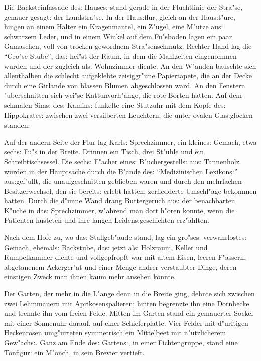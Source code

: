 \documentclass[oneside,12pt]{book}
\newcommand{\s}{s:}%
\begin{document}
\newpage\begin{center}
{\large \so{F"unfte{\s} Kapitel}}\bigskip\bigskip
\end{center}

Die Backsteinfassade de{\s} Hause{\s} stand gerade in der
Fluchtlinie der Stra"se, genauer gesagt: der Landstra"se. In der
Hau{\s}flur, gleich an der Hau{\s}t"ure, hingen an einem Halter
ein Kragenmantel, ein Z"ugel, eine M"utze au{\s} schwarzem Leder,
und in einem Winkel auf dem Fu"sboden lagen ein paar Gamaschen,
voll von trocken gewordnem Stra"senschmutz. Rechter Hand lag die
"`Gro"se Stube"', da{\s} hei"st der Raum, in dem die Mahlzeiten
eingenommen wurden und der zugleich al{\s} Wohnzimmer diente. An
den W"anden bauschte sich allenthalben die schlecht aufgeklebte
zeisiggr"une Papiertapete, die an der Decke durch eine Girlande
von blassen Blumen abgeschlossen ward. An den Fenstern
"uberschnitten sich wei"se Kattunvorh"ange, die rote Borten
hatten. Auf dem schmalen Sim{\s} de{\s} Kamin{\s} funkelte eine
Stutzuhr mit dem Kopfe de{\s} Hippokrate{\s} zwischen zwei
versilberten Leuchtern, die unter ovalen Gla{\s}glocken standen.

Auf der andern Seite der Flur lag Karl{\s} Sprechzimmer, ein
kleine{\s} Gemach, etwa sech{\s} Fu"s in der Breite. Drinnen ein
Tisch, drei St"uhle und ein Schreibtischsessel. Die sech{\s}
F"acher eine{\s} B"uchergestell{\s} au{\s} Tannenholz wurden in
der Hauptsache durch die B"ande de{\s} "`Medizinischen
Lexikon{\s}"' au{\s}gef"ullt, die unaufgeschnitten geblieben waren
und durch den mehrfachen Besitzerwechsel, den sie bereit{\s}
erlebt hatten, zerfledderte Umschl"age bekommen hatten. Durch die
d"unne Wand drang Buttergeruch au{\s} der benachbarten K"uche in
da{\s} Sprechzimmer, w"ahrend man dort h"oren konnte, wenn die
Patienten husteten und ihre langen Leiden{\s}geschichten
erz"ahlten.

Nach dem Hofe zu, wo da{\s} Stallgeb"aude stand, lag ein
gro"se{\s} verwahrloste{\s} Gemach, ehemal{\s} Backstube, da{\s}
jetzt al{\s} Holzraum, Keller und Rumpelkammer diente und
vollgepfropft war mit altem Eisen, leeren F"assern, abgetanenem
Ackerger"at und einer Menge andrer verstaubter Dinge, deren
einstigen Zweck man ihnen kaum mehr ansehen konnte.

Der Garten, der mehr in die L"ange denn in die Breite ging, dehnte
sich zwischen zwei Lehmmauern mit Aprikosenspalieren; hinten
begrenzte ihn eine Dornhecke und trennte ihn vom freien Felde.
Mitten im Garten stand ein gemauerter Sockel mit einer Sonnenuhr
darauf, auf einer Schieferplatte. Vier Felder mit d"urftigen
Heckenrosen umg"urteten symmetrisch ein Mittelbeet mit
n"utzlicherem Gew"ach{\s}. Ganz am Ende de{\s} Garten{\s}, in
einer Fichtengruppe, stand eine Tonfigur: ein M"onch, in sein
Brevier vertieft.
\end{document}
